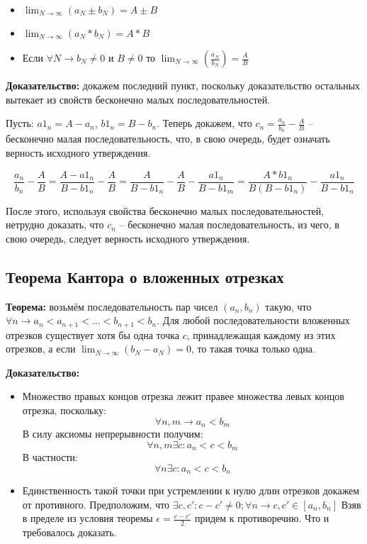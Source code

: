 \documentclass{article}
\begin{document}
\begin{itemize}
  \item $\lim_{N\rightarrow\infty}(a_N \pm b_N) = A \pm B$
  \item $\lim_{N\rightarrow\infty}(a_N * b_N) = A * B$
  \item Если $\forall N \rightarrow b_N \neq 0$ и $B \neq 0$ то $\lim_{N\rightarrow\infty}(\frac{a_N}{b_N}) = \frac{A}{B}$
\end{itemize}

\textbf{Доказательство:} докажем последний пункт, поскольку доказательство остальных вытекает из свойств бесконечно малых последовательностей.

Пусть: $a1_n = A - a_n$, $b1_n = B - b_n$. Теперь докажем, что $c_n = \frac{a_n}{b_n} - \frac{A}{B}$ -- бесконечно малая последовательность, что, в свою очередь, будет означать верность исходного утверждения.

\[ \frac{a_n}{b_n} - \frac{A}{B} = \frac{A - a1_n}{B - b1_n} - \frac{A}{B} = \frac{A}{B - b1_n} - \frac{A}{B} - \frac{a1_n}{B - b1_m} = \frac{A * b1_n}{B(B - b1_n)} - \frac{a1_n}{B - b1_n}\]

После этого, используя свойства бесконечно малых последовательностей, нетрудно доказать, что $c_n$ -- бесконечно малая последовательность, из чего, в свою очередь, следует верность исходного утверждения.

\subsection{Теорема Кантора о вложенных отрезках}

\textbf{Теорема:} возьмём последовательность пар чисел $(a_n, b_n)$ такую, что $\forall n \rightarrow a_n < a_{n + 1} < ... < b_{n + 1} < b_n$. Для любой последовательности вложенных отрезков существует хотя бы одна точка $c$, принадлежащая каждому из этих отрезков, а если $\lim_{N \rightarrow \infty}(b_N - a_N) = 0$, то такая точка только одна.

\textbf{Доказательство:} 
\begin{itemize}
    \item Множество правых концов отрезка лежит правее множества левых концов отрезка, поскольку: 
\[\forall n, m \rightarrow a_n < b_m\] 
В силу аксиомы непрерывности получим:
\[\forall n, m \exists c: a_n < c < b_m\]
В частности:
\[\forall n \exists c: a_n < c < b_n\]
    \item Единственность такой точки при устремлении к нулю длин отрезков докажем от противного. Предположим, что $\exists c, c' : c - c' \neq 0; \forall n \rightarrow c, c' \in [a_n, b_n]$
    Взяв в пределе из условия теоремы $\epsilon = \frac{c - c'}{2}$ придем к противоречию. Что и требовалось доказать.
\end{itemize}
\end{document}
